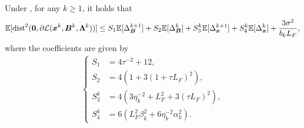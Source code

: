 \begin{lemma}
    \label{Lemma: Stationarity error bound in SGDM} Under ,
    for any $k \geq 1$, it holds that
    \begin{align}\label{Eq: the stationarity error bound in SGDM Lemma}
        \mathbb{E} [\text{dist}^{2}(\bm{0}, \partial \mathcal{L}(\bm{x}^{k}, \bm{B}^{k}, \bm{\Lambda}^{k}))] \leq S_{1}\mathbb{E}[ \Delta_{\bm{B}}^{k+1}] + S_{2}\mathbb{E}[ \Delta_{\bm{B}}^{k}] + S_{3}^{k}\mathbb{E}[ \Delta_{\bm{x}}^{k+1}] + S_{4}^{k}\mathbb{E} [\Delta_{\bm{x}}^{k}] + \frac{3\sigma^{2}}{b_{k}L_{F}},
    \end{align}
    where the coefficients are given by
    \begin{align}
        \label{Eq: the coefficients of stationarity error bound in SGDM}\begin{cases}S_{1}&= 4\tau^{-2}+ 12,\\ S_{2}&= 4(1 + 3 (1 + \tau L_{F})^{2}),\\ S_{3}^{k}&= 4(3\eta_{k}^{-2}+ L_{F}^{2}+ 3 (\tau L_{F})^{2}),\\ S_{4}^{k}&= 6 ( L^2_{F}\beta_{k}^{2}+ 6 \eta_{k}^{-2}\alpha_{k}^{2}).\end{cases}
    \end{align}
\end{lemma}
